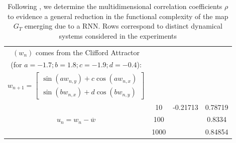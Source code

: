 \begin{center}
\begin{table}
{\begin{tabular}{|c|c| c c |}
          
               \hline  
               $(w_n)$ comes from the Clifford Attractor \\ (for $a = -1.7; b = 1.8; c = -1.9; d = -0.4$): & & & \\
        {$w_{n+1}= \begin{bmatrix} \sin(aw_{n,y}) + c\cos(aw_{n,x}) \\ 
                                                                    \sin(bw_{n,x})+d\cos(bw_{n,y}) \end{bmatrix}$} & & & \\
          \multirow{3}{*}{$u_n = w_n-\overline{w}$}
              & 10 & -0.21713 & 0.78719 \\
              & 100 & &  0.8334 \\
              & 1000 & & 0.84854 \\
           \hline
                \end{tabular}} %
 \label{Table_FC}
 \caption{Following \cite{manjunath2021universal}, we determine the multidimensional correlation coefficients $\rho$ to evidence a general reduction in the functional complexity of the map $G_T$ emerging due to a RNN. Rows correspond to distinct dynamical systems considered in the experiments
}
\end{table}
\end{center}
